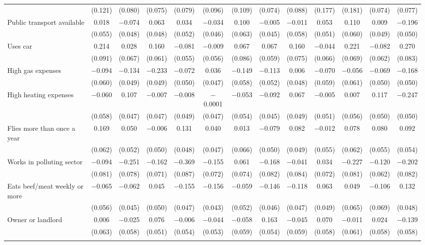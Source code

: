 \begin{tabular}{@{\extracolsep{5pt}}lcccccccccccc}
  & (0.121) & (0.080) & (0.075) & (0.079) & (0.096) & (0.109) & (0.074) & (0.088) & (0.177) & (0.181) & (0.074) & (0.077) \\ 
  Public transport available & 0.018 & $-$0.074 & 0.063 & 0.034 & $-$0.034 & 0.100 & $-$0.005 & $-$0.011 & 0.053 & 0.110 & 0.009 & $-$0.196 \\ 
  & (0.055) & (0.048) & (0.048) & (0.052) & (0.046) & (0.063) & (0.045) & (0.058) & (0.051) & (0.060) & (0.049) & (0.050) \\ 
  Uses car & 0.214 & 0.028 & 0.160 & $-$0.081 & $-$0.009 & 0.067 & 0.067 & 0.160 & $-$0.044 & 0.221 & $-$0.082 & 0.270 \\ 
  & (0.091) & (0.067) & (0.061) & (0.055) & (0.056) & (0.086) & (0.059) & (0.075) & (0.066) & (0.069) & (0.062) & (0.083) \\ 
  High gas expenses & $-$0.094 & $-$0.134 & $-$0.233 & $-$0.072 & 0.036 & $-$0.149 & $-$0.113 & 0.006 & $-$0.070 & $-$0.056 & $-$0.069 & $-$0.168 \\ 
  & (0.060) & (0.049) & (0.049) & (0.050) & (0.047) & (0.058) & (0.052) & (0.048) & (0.059) & (0.061) & (0.050) & (0.050) \\ 
  High heating expenses & $-$0.060 & 0.107 & $-$0.007 & $-$0.008 & $-$0.0001 & $-$0.053 & $-$0.092 & 0.067 & $-$0.005 & 0.007 & 0.117 & $-$0.247 \\ 
  & (0.058) & (0.047) & (0.047) & (0.049) & (0.047) & (0.054) & (0.045) & (0.049) & (0.051) & (0.056) & (0.050) & (0.050) \\ 
  Flies more than once a year & 0.169 & 0.050 & $-$0.006 & 0.131 & 0.040 & 0.013 & $-$0.079 & 0.082 & $-$0.012 & 0.078 & 0.080 & 0.092 \\ 
  & (0.062) & (0.052) & (0.050) & (0.048) & (0.047) & (0.066) & (0.050) & (0.049) & (0.055) & (0.062) & (0.055) & (0.054) \\ 
  Works in polluting sector & $-$0.094 & $-$0.251 & $-$0.162 & $-$0.369 & $-$0.155 & 0.061 & $-$0.168 & $-$0.041 & 0.034 & $-$0.227 & $-$0.120 & $-$0.202 \\ 
  & (0.081) & (0.078) & (0.071) & (0.087) & (0.072) & (0.074) & (0.082) & (0.084) & (0.072) & (0.081) & (0.062) & (0.082) \\ 
  Eats beef/meat weekly or more & $-$0.065 & $-$0.062 & 0.045 & $-$0.155 & $-$0.156 & $-$0.059 & $-$0.146 & $-$0.118 & 0.063 & 0.049 & $-$0.106 & 0.132 \\ 
  & (0.056) & (0.045) & (0.050) & (0.047) & (0.043) & (0.052) & (0.046) & (0.047) & (0.049) & (0.065) & (0.069) & (0.048) \\ 
  Owner or landlord & 0.006 & $-$0.025 & 0.076 & $-$0.006 & $-$0.044 & $-$0.058 & 0.163 & $-$0.045 & 0.070 & $-$0.011 & 0.024 & $-$0.139 \\ 
  & (0.063) & (0.058) & (0.051) & (0.054) & (0.053) & (0.059) & (0.054) & (0.059) & (0.058) & (0.061) & (0.058) & (0.058) \\ 
 \hline \\[-1.8ex] 


\end{tabular}
